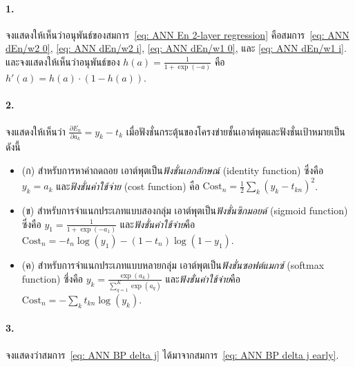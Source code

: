 \paragraph{1.} 
จงแสดงให้เห็นว่าอนุพันธ์ของสมการ~\ref{eq: ANN En 2-layer regression} 
คือสมการ~\ref{eq: ANN dEn/w2 0}, \ref{eq: ANN dEn/w2 i}, \ref{eq: ANN dEn/w1 0}, และ \ref{eq: ANN dEn/w1 i}.
และจงแสดงให้เห็นว่าอนุพันธ์ของ $h(a) = \frac{1}{1 + \exp(-a)}$ คือ
$h'(a) = h(a) \cdot (1 - h(a))$.

\paragraph{2.}
จงแสดงให้เห็นว่า $\frac{\partial E_n}{\partial a_k} = y_k - t_k$
เมื่อฟังชั่นกระตุ้นของโครงข่ายชั้นเอาต์พุตและฟังชั่นเป้าหมายเป็นดังนี้
\begin{itemize}
\item (ก) สำหรับการหาค่าถดถอย เอาต์พุตเป็น\textit{ฟังชั่นเอกลักษณ์} (identity function) ซึ่งคือ $y_k = a_k$ และ\textit{ฟังชั่นค่าใช้จ่าย} (cost function) คือ $\mathrm{Cost}_n = \frac{1}{2} \sum_k (y_k - t_{kn})^2$.
\item (ข) สำหรับการจำแนกประเภทแบบสองกลุ่ม เอาต์พุตเป็น\textit{ฟังชั่นซิกมอยด์} (sigmoid function) ซึ่งคือ $y_1 = \frac{1}{1 + \exp(-a_1)}$ และ\textit{ฟังชั่นค่าใช้จ่าย}คือ $\mathrm{Cost}_n = - t_n \log (y_1) - (1-t_n) \log(1-y_1)$.
\item (ค) สำหรับการจำแนกประเภทแบบหลายกลุ่ม เอาต์พุตเป็น\textit{ฟังชั่นซอฟต์แมกซ์} (softmax function) ซึ่งคือ $y_k = \frac{\exp(a_k)}{\sum_{q=1}^K \exp(a_q)}$ 
และ\textit{ฟังชั่นค่าใช้จ่าย}คือ $\mathrm{Cost}_n = - \sum_k t_{kn} \log (y_k)$.
\end{itemize}

\paragraph{3.}
จงแสดงว่าสมการ~\ref{eq: ANN BP delta j} ได้มาจากสมการ~\ref{eq: ANN BP delta j early}.

